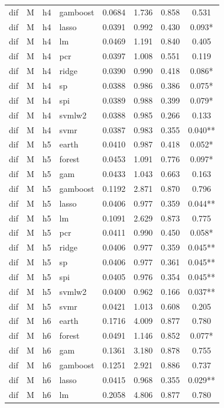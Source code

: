\begin{ThreePartTable}
\begin{longtable}[t]{llclcccc}
dif & M & h4 & gamboost & 0.0684 & 1.736 & 0.858 & 0.531\\
dif & M & h4 & lasso & 0.0391 & 0.992 & 0.430 & 0.093*\\
dif & M & h4 & lm & 0.0469 & 1.191 & 0.840 & 0.405\\
dif & M & h4 & pcr & 0.0397 & 1.008 & 0.551 & 0.119\\
dif & M & h4 & ridge & 0.0390 & 0.990 & 0.418 & 0.086*\\
dif & M & h4 & sp & 0.0388 & 0.986 & 0.386 & 0.075*\\
dif & M & h4 & spi & 0.0389 & 0.988 & 0.399 & 0.079*\\
dif & M & h4 & svmlw2 & 0.0388 & 0.985 & 0.266 & 0.133\\
dif & M & h4 & svmr & 0.0387 & 0.983 & 0.355 & 0.040**\\
\addlinespace
dif & M & h5 & earth & 0.0410 & 0.987 & 0.418 & 0.052*\\
dif & M & h5 & forest & 0.0453 & 1.091 & 0.776 & 0.097*\\
dif & M & h5 & gam & 0.0433 & 1.043 & 0.663 & 0.163\\
dif & M & h5 & gamboost & 0.1192 & 2.871 & 0.870 & 0.796\\
dif & M & h5 & lasso & 0.0406 & 0.977 & 0.359 & 0.044**\\
dif & M & h5 & lm & 0.1091 & 2.629 & 0.873 & 0.775\\
dif & M & h5 & pcr & 0.0411 & 0.990 & 0.450 & 0.058*\\
dif & M & h5 & ridge & 0.0406 & 0.977 & 0.359 & 0.045**\\
dif & M & h5 & sp & 0.0406 & 0.977 & 0.361 & 0.045**\\
dif & M & h5 & spi & 0.0405 & 0.976 & 0.354 & 0.045**\\
dif & M & h5 & svmlw2 & 0.0400 & 0.962 & 0.166 & 0.037**\\
dif & M & h5 & svmr & 0.0421 & 1.013 & 0.608 & 0.205\\
\addlinespace
dif & M & h6 & earth & 0.1716 & 4.009 & 0.877 & 0.780\\
dif & M & h6 & forest & 0.0491 & 1.146 & 0.852 & 0.077*\\
dif & M & h6 & gam & 0.1361 & 3.180 & 0.878 & 0.755\\
dif & M & h6 & gamboost & 0.1251 & 2.921 & 0.886 & 0.737\\
dif & M & h6 & lasso & 0.0415 & 0.968 & 0.355 & 0.029**\\
dif & M & h6 & lm & 0.2058 & 4.806 & 0.877 & 0.780\\

\end{longtable}
\end{ThreePartTable}
